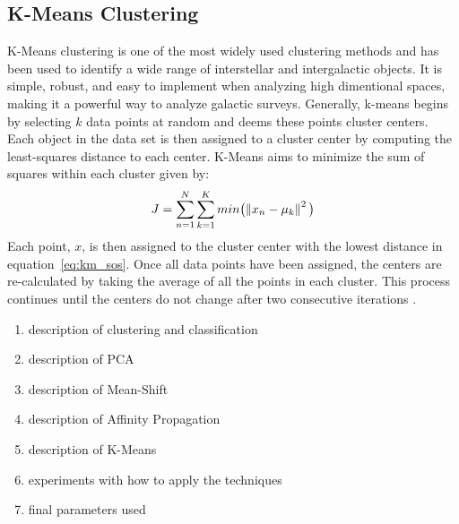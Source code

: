 \subsection{K-Means Clustering}
K-Means clustering is one of the most widely used clustering methods and has been used to identify a wide range of interstellar and intergalactic objects. %
It is simple, robust, and easy to implement when analyzing high dimentional spaces, making it a powerful way to analyze galactic surveys. 
Generally, k-means begins by selecting $k$ data points at random and deems these points cluster centers.
Each object in the data set is then assigned to a cluster center by computing the least-squares distance to each center.
K-Means aims to minimize the sum of squares within each cluster given by:
\begin{equation}
\label{eq:km_sos}
J = \sum_{n=1}^N \sum_{k=1}^K min \big( \norm{x_n - \mu_k}^2 \big)
\end{equation}
Each point, $x$, is then assigned to the cluster center with the lowest distance in equation~\ref{eq:km_sos}\citet{tammour16}.
Once all data points have been assigned, the centers are re-calculated by taking the average of all the points in each cluster. 
This process continues until the centers do not change after two consecutive iterations \citet{sanchez-almeida13}. 


\begin{enumerate}
\item description of clustering and classification 
\item description of PCA
\item description of Mean-Shift
\item description of Affinity Propagation
\item description of K-Means
\item experiments with how to apply the techniques
\item final parameters used
\end{enumerate}
